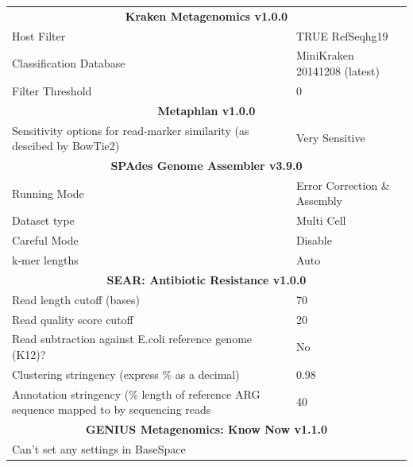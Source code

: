 \begin{table}[]
{\begin{tabular}{ll}
\multicolumn{2}{c}{\textbf{Kraken Metagenomics v1.0.0}}                                 \\
Host Filter                                     & TRUE RefSeqhg19              \\
Classification Database                         & MiniKraken 20141208 (latest) \\
Filter Threshold                                & 0                            \\
\multicolumn{2}{c}{\textbf{Metaphlan v1.0.0}}                                           \\
Sensitivity options for read-marker similarity (as descibed by BowTie2)                  & Very Sensitive \\
\multicolumn{2}{c}{\textbf{SPAdes Genome Assembler v3.9.0}}                             \\
Running Mode                                    & Error Correction \& Assembly \\
Dataset type                                    & Multi Cell                   \\
Careful Mode                                    & Disable                      \\
k-mer lengths                                   & Auto                         \\
\multicolumn{2}{c}{\textbf{SEAR: Antibiotic Resistance v1.0.0}}                                           \\
Read length cutoff (bases)                      & 70                           \\
Read quality score cutoff                       & 20                           \\
Read subtraction against E.coli reference genome (K12)?                                  & No             \\
Clustering stringency (express \% as a decimal) & 0.98                         \\
Annotation stringency (\% length of reference ARG sequence mapped to by sequencing reads & 40             \\
\multicolumn{2}{c}{\textbf{GENIUS Metagenomics: Know Now v1.1.0}}                                                  \\
Can't set any settings in BaseSpace             &                             
\end{tabular}%
}
\end{table}

